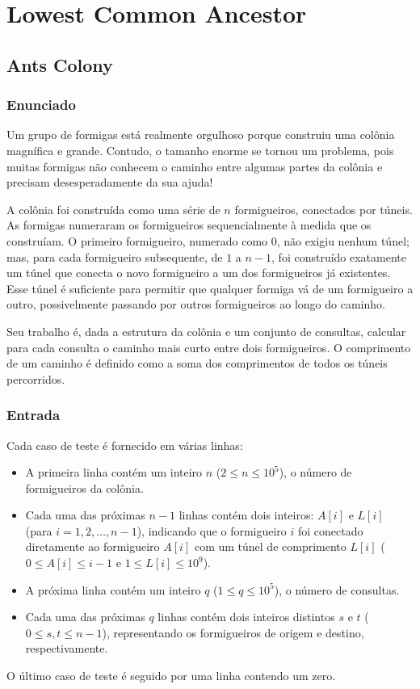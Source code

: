 \section{Lowest Common Ancestor}
\subsection{Ants Colony}

\subsubsection*{Enunciado}
Um grupo de formigas está realmente orgulhoso porque construiu uma colônia magnífica e grande. Contudo, o tamanho enorme se tornou um problema, pois muitas formigas não conhecem o caminho entre algumas partes da colônia e precisam desesperadamente da sua ajuda!

A colônia foi construída como uma série de \(n\) formigueiros, conectados por túneis. As formigas numeraram os formigueiros sequencialmente à medida que os construíam. O primeiro formigueiro, numerado como \(0\), não exigiu nenhum túnel; mas, para cada formigueiro subsequente, de \(1\) a \(n-1\), foi construído exatamente um túnel que conecta o novo formigueiro a um dos formigueiros já existentes. Esse túnel é suficiente para permitir que qualquer formiga vá de um formigueiro a outro, possivelmente passando por outros formigueiros ao longo do caminho.

Seu trabalho é, dada a estrutura da colônia e um conjunto de consultas, calcular para cada consulta o caminho mais curto entre dois formigueiros. O comprimento de um caminho é definido como a soma dos comprimentos de todos os túneis percorridos.

\subsubsection*{Entrada}
Cada caso de teste é fornecido em várias linhas:
\begin{itemize}
    \item A primeira linha contém um inteiro \(n\) (\(2 \le n \le 10^5\)), o número de formigueiros da colônia.
    \item Cada uma das próximas \(n-1\) linhas contém dois inteiros: \(A[i]\) e \(L[i]\) (para \(i = 1,2,\dots,n-1\)), indicando que o formigueiro \(i\) foi conectado diretamente ao formigueiro \(A[i]\) com um túnel de comprimento \(L[i]\) (\(0 \le A[i] \le i-1\) e \(1 \le L[i] \le 10^9\)).
    \item A próxima linha contém um inteiro \(q\) (\(1 \le q \le 10^5\)), o número de consultas.
    \item Cada uma das próximas \(q\) linhas contém dois inteiros distintos \(s\) e \(t\) (\(0 \le s, t \le n-1\)), representando os formigueiros de origem e destino, respectivamente.
\end{itemize}
O último caso de teste é seguido por uma linha contendo um zero.

